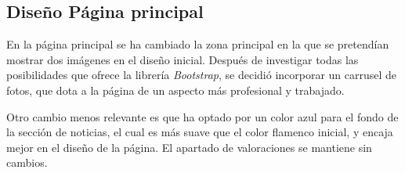 \documentclass[11pt, a4paper]{book}
\begin{document}
	\subsection{Diseño Página principal}
	
	En la página principal se ha cambiado la zona principal en la que se pretendían mostrar dos imágenes en el diseño inicial. Después de investigar todas las posibilidades que ofrece la librería \textit{Bootstrap}, se decidió incorporar un carrusel de fotos, que dota a la página de un aspecto más profesional y trabajado.
	
	Otro cambio menos relevante es que ha optado por un color azul para el fondo de la sección de noticias, el cual es más suave que el color flamenco inicial, y encaja mejor en el diseño de la página. El apartado de valoraciones se mantiene sin cambios.
	
\end{document}
